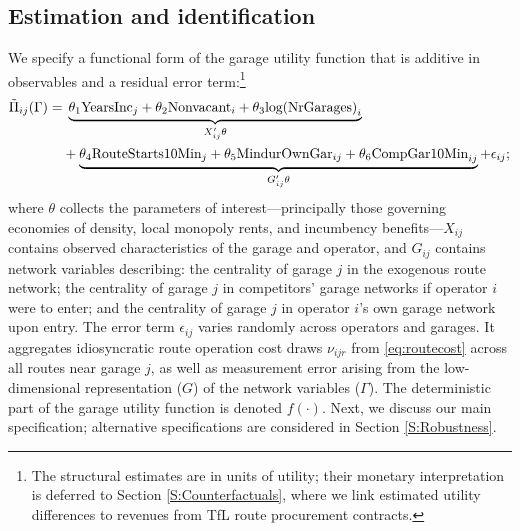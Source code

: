 \documentclass[12pt]{article}
\begin{document}
\subsection{Estimation and identification}\label{SS:estimation}
 We specify a functional form of the garage utility function that is additive 
in observables and a residual error term:\footnote{The structural estimates are in units of utility; their monetary 
interpretation is deferred to Section \ref{S:Counterfactuals}, where we link 
estimated utility differences to revenues from TfL route procurement contracts.}
\begin{align}\label{eq:garagevalue_detail}
\tilde{\Pi}_{ij}(\Gamma) = &\; \underbrace{\theta_1 \text{YearsInc}_{j} + \theta_2 \text{Nonvacant}_i 
+ \theta_3 \text{log(NrGarages)}_i }_{X_{ij}'\theta} \notag \\
&+ \underbrace{\theta_4 \text{RouteStarts10Min}_{j} + \theta_5 \text{MindurOwnGar}_{ij} 
+ \theta_6 \text{CompGar10Min}_{ij}}_{G_{ij}'\theta} + \epsilon_{ij};
\end{align}
where $\theta$ collects the parameters of interest---principally those governing 
economies of density, local monopoly rents, and incumbency benefits---$X_{ij}$ 
contains observed characteristics of the garage and operator, and $G_{ij}$ 
contains network variables describing: the centrality of garage $j$ in the 
exogenous route network; the centrality of garage $j$ in competitors' garage 
networks if operator $i$ were to enter; and the centrality of garage $j$ in 
operator $i$'s own garage network upon entry. The error term $\epsilon_{ij}$ 
varies randomly across operators and garages. It aggregates idiosyncratic route 
operation cost draws $\nu_{ijr}$ from \eqref{eq:routecost} across all routes 
near garage $j$, as well as measurement error arising from the low-dimensional 
representation ($G$) of the network variables ($\Gamma$). The deterministic part of the garage utility function is denoted 
$f(\cdot)$. Next, we discuss our main specification; alternative specifications are considered in Section \ref{S:Robustness}.
\end{document}
